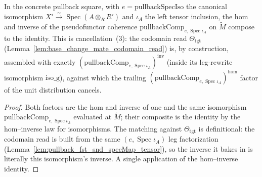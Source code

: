 \begin{lemma}

  \label{lem:base_change_mate_inner_eCancel_pullbackComp}
  In the concrete pullback square, with \(e = \mathrm{pullbackSpecIso}\) the canonical isomorphism
  \(X' \xrightarrow{\sim} \operatorname{Spec}(A \otimes_R R')\) and \(\iota_A\) the left tensor
  inclusion, the hom and inverse of the pseudofunctor coherence
  \(\mathrm{pullbackComp}_{e,\operatorname{Spec}\iota_A}\) on \(\widetilde M\) compose to the
  identity. This is cancellation~(3): the codomain read \(\Theta_{\mathrm{tgt}}\)
  (Lemma~\ref{lem:base_change_mate_codomain_read}) is, by construction, assembled with exactly
  \((\mathrm{pullbackComp}_{e,\operatorname{Spec}\iota_A})^{\mathrm{inv}}\) (inside its leg-rewrite
  isomorphism \(\mathrm{iso\_g}\)), against which the trailing
  \((\mathrm{pullbackComp}_{e,\operatorname{Spec}\iota_A})^{\mathrm{hom}}\) factor of the unit
  distribution cancels.
\end{lemma}
\begin{proof}
  Both factors are the hom and inverse of one and the same isomorphism
  \(\mathrm{pullbackComp}_{e,\operatorname{Spec}\iota_A}\) evaluated at \(\widetilde M\); their
  composite is the identity by the hom--inverse law for isomorphisms. The matching against
  \(\Theta_{\mathrm{tgt}}\) is definitional: the codomain read is built from the same
  \((e, \operatorname{Spec}\iota_A)\) leg factorization
  (Lemma~\ref{lem:pullback_fst_snd_specMap_tensor}), so the inverse it bakes in is literally this
  isomorphism's inverse. A single application of the hom--inverse identity.
\end{proof}

